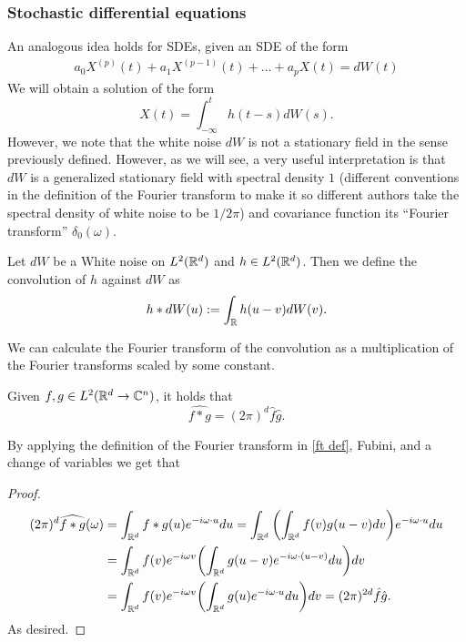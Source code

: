 \documentclass[
    a4paper,
    DIV=14,
    abstract=true,
    numbers=noenddot
]{scrartcl}
\begin{document}
\subsubsection{Stochastic differential equations}
An analogous idea holds for SDEs, given an SDE of the form
\begin{align*}\label{diff equation}
	a_0X^{(p)}(t)+a_1X^{(p-1)}(t)+\ldots+a_pX(t)=dW(t)
\end{align*}
We will obtain a solution of the form
\begin{equation*}
	X(t)=\int_{-\infty}^t h(t-s)dW(s).
\end{equation*}
However, we note that the white noise $dW$ is not a stationary field in the sense previously defined. However, as we will see, a very useful interpretation is that $dW$ is a generalized stationary field with spectral density $1$ (different conventions in the definition of the Fourier transform to make it so different authors take the spectral density of white noise to be $1/2\pi$) and covariance function its ``Fourier transform'' $\delta_0(\omega)$.
\begin{definition}
	Let $dW$ be a White noise on $L^2(\mathbb{R}^d)$ and $h\in L^2(\mathbb{R}^d)$. Then we define the convolution of $h$ against $dW$ as $$h* dW(u):=\int_{\mathbb{R}} h(u-v)dW(v).$$
\end{definition}
We can calculate the Fourier transform of the convolution as a multiplication of the Fourier transforms scaled by some constant.
\begin{lemma}
	Given $f,g\in L^2(\mathbb{R}^d\to\mathbb{C}^n)$, it holds that
	\begin{equation*}
		\widehat{f*g}=(2\pi)^d\hat{f}\hat{g}.
	\end{equation*}
\end{lemma}
By applying the definition of the Fourier transform in \eqref{ft def}, Fubini, and a change of variables we get that
\begin{proof}
	\begin{align*}
		(2\pi)^d \widehat{f*g}(\omega) & =\int_{\mathbb{R}^d} f*g(u)e^{-i\omega\cdot u}du= \int_{\mathbb{R}^d} \qty(\int_{\mathbb{R}^d}f(v)g(u-v)dv)e^{-i \omega\cdot u}du \\
		                               & =\int_{\mathbb{R}^d} f(v)e^{-i\omega v}\qty(\int_{\mathbb{R}^d} g(u-v)e^{-i\omega\cdot (u-v)}du)dv                        \\
		                               & =\int_{\mathbb{R}^d} f(v)e^{-i\omega v}\qty(\int_{\mathbb{R}^d} g(u)e^{-i\omega\cdot u}du)dv
		= (2\pi)^{2d}\hat{f}\hat{g}.
	\end{align*}
	As desired.
\end{proof}
\end{document}
